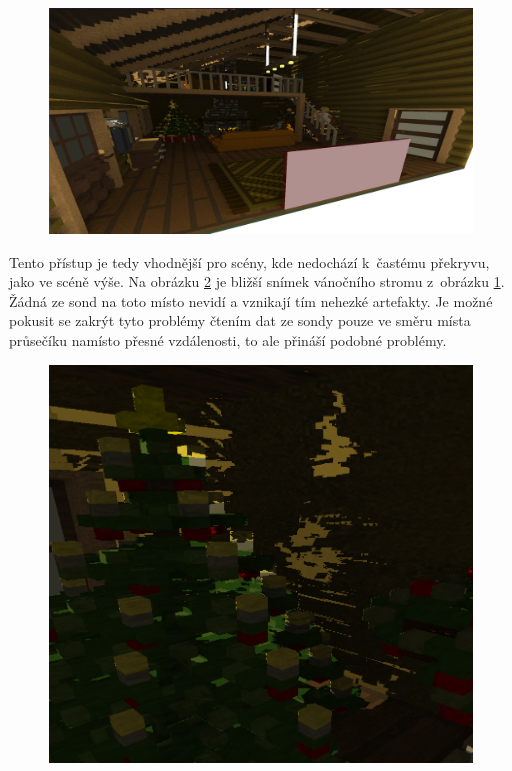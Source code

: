 \begin{figure}[H]
	\centering
	\captionsetup{justification=centering}
	\includegraphics[scale=0.9]{images/render_svo_indirect_1.png}
	\label{fig:render_indirect_1}
\end{figure}

Tento přístup je tedy vhodnější pro scény, kde nedochází k~častému překryvu, jako ve scéně výše. Na obrázku \ref{fig:tree_closeup} je bližší snímek vánočního stromu z~obrázku \ref{fig:render_indirect_1}. Žádná ze sond na toto místo nevidí a vznikají tím nehezké artefakty. Je možné pokusit se zakrýt tyto problémy čtením dat ze sondy pouze ve směru místa průsečíku namísto přesné vzdálenosti, to ale přináší podobné problémy.

\begin{figure}[H]
	\centering
	\captionsetup{justification=centering}
	\includegraphics[scale=1.15]{images/tree_closeup.png}
	\label{fig:tree_closeup}
\end{figure}


